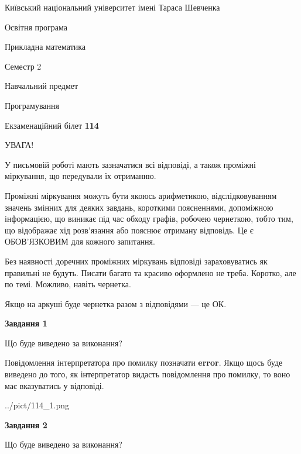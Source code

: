 \documentclass[12pt, ukrainian]{article}
\begin{document}
{{\begin {small}\par
{ \center  Київський національний університет імені Тараса Шевченка \par}
{\parbox {5 cm}{Освітня програма \hfill}{\parbox {7 cm}{Прикладна математика \hfill}}\parbox {6 cm}{\hfill Семестр 2}}\par
{\parbox {5 cm} {Навчальний предмет \hfill}\parbox {7 cm}{Програмування \hfill}\parbox {6cm}{\hfill}\par}\vspace{-7pt} \end{small}}{\center Екзаменаційний білет \No \textbf
{ 114 }\par}}
{
\begin {large}
УВАГА!

У письмовій роботі мають зазначатися всі відповіді, а також проміжні міркування, що передували їх отриманню.

Проміжні міркування можуть бути якоюсь арифметикою, відслідковуванням зна\-чень змінних для деяких завдань,
короткими поясненнями, допоміжною інформацією, що виникає під час обходу графів, робочею чернеткою,
тобто тим, що відображає хід розв’язання або пояснює отриману відповідь.
Це є ОБОВ’ЯЗКОВИМ для кожного запитання.

Без наявності доречних проміжних міркувань відповіді зараховуватись як правиль\-ні не будуть.
Писати багато та красиво оформлено не треба. Коротко, але по темі. Можли\-во, навіть чернетка.

Якщо на аркуші буде чернетка разом з відповідями --- це ОК.

\newpage

{\begin {center}\textbf{Завдання 1}\end {center}}\par
Що буде виведено за виконання?

Повідомлення інтерпретатора про помилку позначати \textbf{error}.
Якщо щось буде виведено до того, як інтерпретатор видасть повідомлення про помилку, 
то воно має вказуватись у відповіді. \par


\begin{center}
	{../pict/114_1.png}
\end{center}
\newpage

{\begin {center}\textbf{Завдання 2}\end {center}}\par
Що буде виведено за виконання?


\end{large}}
\end{document}
